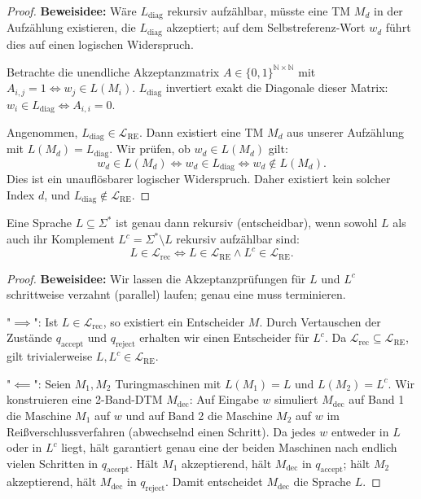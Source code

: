 \begin{proof}
    \textbf{Beweisidee:} Wäre $L_{\mathrm{diag}}$ rekursiv aufzählbar, müsste eine TM $M_d$ in der Aufzählung existieren, die $L_{\mathrm{diag}}$ akzeptiert; auf dem Selbstreferenz-Wort $w_d$ führt dies auf einen logischen Widerspruch.
    
    Betrachte die unendliche Akzeptanzmatrix $A \in \{0, 1\}^{\mathbb{N} \times \mathbb{N}}$ mit $A_{i,j} = 1 \iff w_j \in L(M_i)$. $L_{\mathrm{diag}}$ invertiert exakt die Diagonale dieser Matrix: $w_i \in L_{\mathrm{diag}} \iff A_{i,i} = 0$.
    
    Angenommen, $L_{\mathrm{diag}} \in \mathcal{L}_{\mathrm{RE}}$. Dann existiert eine TM $M_d$ aus unserer Aufzählung mit $L(M_d) = L_{\mathrm{diag}}$. Wir prüfen, ob $w_d \in L(M_d)$ gilt:
    \[
        w_d \in L(M_d) \iff w_d \in L_{\mathrm{diag}} \iff w_d \notin L(M_d).
    \]
    Dies ist ein unauflösbarer logischer Widerspruch. Daher existiert kein solcher Index $d$, und $L_{\mathrm{diag}} \notin \mathcal{L}_{\mathrm{RE}}$.
\end{proof}

\begin{theorem}
    Eine Sprache $L \subseteq \Sigma^*$ ist genau dann rekursiv (entscheidbar), wenn sowohl $L$ als auch ihr Komplement $L^c = \Sigma^* \setminus L$ rekursiv aufzählbar sind:
    \[
        L \in \mathcal{L}_{\mathrm{rec}} \iff L \in \mathcal{L}_{\mathrm{RE}} \land L^c \in \mathcal{L}_{\mathrm{RE}}.
    \]
\end{theorem}

\begin{proof}
    \textbf{Beweisidee:} Wir lassen die Akzeptanzprüfungen für $L$ und $L^c$ schrittweise verzahnt (parallel) laufen; genau eine muss terminieren.
    
    "$\implies$": Ist $L \in \mathcal{L}_{\mathrm{rec}}$, so existiert ein Entscheider $M$. Durch Vertauschen der Zustände $q_{\mathrm{accept}}$ und $q_{\mathrm{reject}}$ erhalten wir einen Entscheider für $L^c$. Da $\mathcal{L}_{\mathrm{rec}} \subseteq \mathcal{L}_{\mathrm{RE}}$, gilt trivialerweise $L, L^c \in \mathcal{L}_{\mathrm{RE}}$.
    
    "$\impliedby$": Seien $M_1, M_2$ Turingmaschinen mit $L(M_1) = L$ und $L(M_2) = L^c$. Wir konstruieren eine 2-Band-DTM $M_{\mathrm{dec}}$: Auf Eingabe $w$ simuliert $M_{\mathrm{dec}}$ auf Band 1 die Maschine $M_1$ auf $w$ und auf Band 2 die Maschine $M_2$ auf $w$ im Reißverschlussverfahren (abwechselnd einen Schritt). Da jedes $w$ entweder in $L$ oder in $L^c$ liegt, hält garantiert genau eine der beiden Maschinen nach endlich vielen Schritten in $q_{\mathrm{accept}}$. Hält $M_1$ akzeptierend, hält $M_{\mathrm{dec}}$ in $q_{\mathrm{accept}}$; hält $M_2$ akzeptierend, hält $M_{\mathrm{dec}}$ in $q_{\mathrm{reject}}$. Damit entscheidet $M_{\mathrm{dec}}$ die Sprache $L$.
\end{proof}

